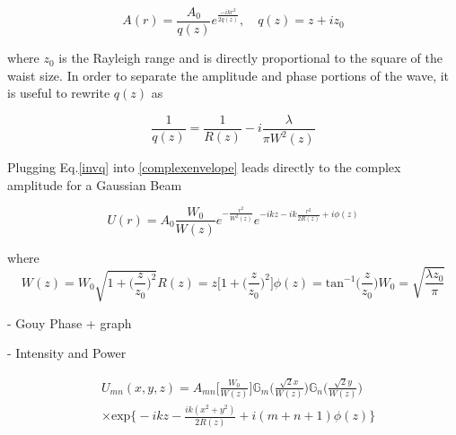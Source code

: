 \documentclass[oneside]{book}
\begin{document}
		\begin{equation} \label{complexenvelope}
		A(r) = \frac{A_0}{q(z)} e^{\frac{-ikr^2}{2q(z)}} , \quad q(z)=z+iz_0
		\end{equation}
		
		where $z_0$ is the Rayleigh range and is directly proportional to the square of the waist size.  In order to separate the amplitude and phase portions of the wave, it is useful to rewrite $q(z)$ as
		
		\begin{equation}\label{invq}
		\frac{1}{q(z)} = \frac{1}{R(z)} - i \frac{\lambda}{\pi W^2(z)}
		\end{equation} 
		
		Plugging Eq.\ref{invq} into \ref{complexenvelope} leads directly to the complex amplitude for a Gaussian Beam
		
		\begin{equation}
		U(r) = A_0 \frac{W_0}{W(z)} e^{-\frac{r^2}{W^2(z)}} e^{-ikz - ik \frac{r^2}{2R(z)} + i \phi(z)}
		\end{equation}
		
		where
		\begin{subequations}
		\begin{equation}
		W(z) = W_0 \sqrt{1 + \bigg( \frac{z}{z_0} \bigg)^2}
		\end{equation}
		\begin{equation}
		R(z) = z \bigg[ 1 + \bigg( \frac{z}{z_0} \bigg)^2 \bigg]
		\end{equation}
		\begin{equation}
		\phi(z)= \text{tan}^{-1}\bigg(\frac{z}{z_0}\bigg)
		\end{equation}
		\begin{equation}
		W_0 = \sqrt{\frac{\lambda z_0}{\pi}}
		\end{equation}
		\end{subequations}

		
		- Gouy Phase + graph
		
		- Intensity and Power
		
		
		\begin{equation}	
		\begin{aligned}
		&U_{mn}(x,y,z) = A_{mn}\bigg[ \frac{W_0}{W(z)} \bigg] \mathbb{G}_m\Bigg( \frac{\sqrt{2}x}{W(z)}  \Bigg) \mathbb{G}_n\Bigg( \frac{\sqrt{2}y}{W(z)} \Bigg)\\
		&\times \text{exp} \bigg\{ -ikz - \frac{ik(x^2+y^2)}{2R(z)} + i(m+n+1)\phi(z) \bigg\}
		\end{aligned}
		\end{equation}
		
\end{document}

